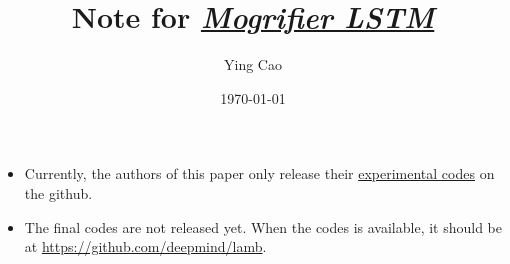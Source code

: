\documentclass {article}
\title{Note for
\textit{\href{https://arxiv.org/abs/1909.01792}{Mogrifier LSTM}}}
\author{Ying Cao}
\date{\today}
\begin{document}
\maketitle
\tableofcontents

\begin{info}

\begin{itemize}
\item Currently, the authors of this paper only release their \href{https://github.com/RMichaelSwan/MogrifierLSTM}{experimental codes}
on the github.
\item The final codes are not released yet. When the codes is available, it should
be at \href{https://github.com/deepmind/lamb}{https://github.com/deepmind/lamb}.
\end{itemize}
\end{info}



{
\small
\raggedright

\begin{spacing}{1}

\end{spacing}
}
\end{document}
